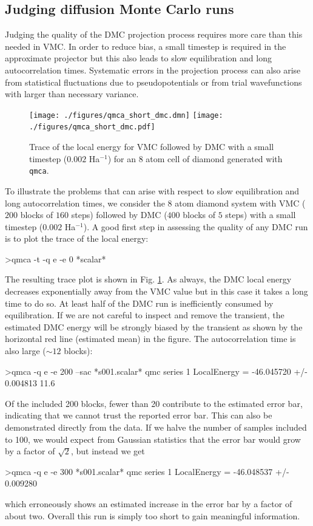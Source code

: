 \subsection{Judging diffusion Monte Carlo runs}
\label{sec:qmca_judge_dmc}
Judging the quality of the DMC projection process requires more 
care than this needed in VMC.  In order to reduce bias, a small 
timestep is required in the approximate projector but this also 
leads to slow equilibration and long autocorrelation times.  
Systematic errors in the projection process can also arise from 
statistical fluctuations due to pseudopotentials or from trial 
wavefunctions with larger than necessary variance.

\begin{figure}
\begin{center}
  \ifdefined\HCode  
\texttt{[image: ./figures/qmca\_short\_dmc.dmn]}
\else
\texttt{[image: ./figures/qmca\_short\_dmc.pdf]}
\fi
\end{center}
\caption{Trace of the local energy for VMC followed by DMC with a small timestep ($0.002$ Ha$^{-1}$) for an 8 atom cell of diamond generated with \texttt{qmca}.}
\label{fig:qmca_short_dmc}
\end{figure}

To illustrate the problems that can arise with respect to slow 
equilibration and long autocorrelation times, we consider the 
8 atom diamond system with VMC ($200$ blocks of $160$ steps) followed 
by DMC ($400$ blocks of $5$ steps) with a small timestep ($0.002$ Ha$^{-1}$).
A good first step in assessing the quality of any DMC run is 
to plot the trace of the local energy:
\begin{shade}
>qmca -t -q e -e 0 *scalar*
\end{shade}
\noindent
The resulting trace plot is shown in Fig. \ref{fig:qmca_short_dmc}.  
As always, the DMC local energy decreases exponentially away from 
the VMC value but in this case it takes a long time to do so.  
At least half of the DMC run is inefficiently consumed by equilibration.
If we are not careful to inspect and remove the transient, the estimated 
DMC energy will be strongly biased by the transient as shown by the 
horizontal red line (estimated mean) in the figure.  The autocorrelation 
time is also large ($\sim 12$ blocks):
\begin{shade}
>qmca -q e -e 200 --sac *s001.scalar*
qmc  series 1  LocalEnergy           =  -46.045720 +/- 0.004813   11.6
\end{shade}
\noindent
Of the included 200 blocks, fewer than 20 contribute to the estimated error 
bar, indicating that we cannot trust the reported error bar.  
This can also be demonstrated directly from the data.  If we halve the number 
of samples included to 100, we would expect from Gaussian statistics 
that the error bar would grow by a factor of $\sqrt{2}$, but instead we 
get
\begin{shade}
>qmca -q e -e 300 *s001.scalar*
qmc  series 1  LocalEnergy           =  -46.048537 +/- 0.009280
\end{shade}
\noindent
which erroneously shows an estimated increase in the error bar by a factor 
of about two.  Overall this run is simply too short to gain meaningful 
information.  

